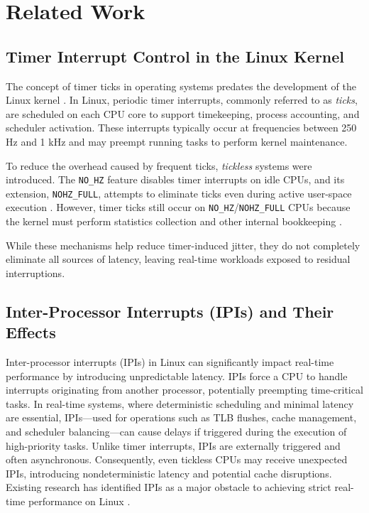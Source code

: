 \documentclass[letterpaper]{article}
\begin{document}
\section{Related Work}\label{BG}
\subsection{Timer Interrupt Control in the Linux Kernel}

The concept of timer ticks in operating systems predates the development of the Linux kernel \cite{Corbet}. 
In Linux, periodic timer interrupts, commonly referred to as \emph{ticks}, are scheduled on each CPU core 
to support timekeeping, process accounting, and scheduler activation. These interrupts typically occur at 
frequencies between 250 Hz and 1 kHz and may preempt running tasks to perform kernel maintenance.  

To reduce the overhead caused by frequent ticks, \emph{tickless} systems were introduced. 
The \texttt{NO\_HZ} feature disables timer interrupts on idle CPUs, and its extension, 
\texttt{NOHZ\_FULL}, attempts to eliminate ticks even during active user-space execution \cite{KernelDocNOHZ}. 
However, timer ticks still occur on \texttt{NO\_HZ}/\texttt{NOHZ\_FULL} CPUs because the kernel must perform 
statistics collection and other internal bookkeeping \cite{stackoverflow}.  

While these mechanisms help reduce timer-induced jitter, they do not completely eliminate all sources of latency, 
leaving real-time workloads exposed to residual interruptions.


\subsection{Inter-Processor Interrupts (IPIs) and Their Effects}

Inter-processor interrupts (IPIs) in Linux can significantly impact real-time performance by introducing 
unpredictable latency. IPIs force a CPU to handle interrupts originating from another processor, 
potentially preempting time-critical tasks. In real-time systems, where deterministic scheduling and 
minimal latency are essential, IPIs—used for operations such as TLB flushes, cache management, 
and scheduler balancing—can cause delays if triggered during the execution of high-priority tasks. 
Unlike timer interrupts, IPIs are externally triggered and often asynchronous. Consequently, even 
tickless CPUs may receive unexpected IPIs, introducing nondeterministic latency and potential cache 
disruptions. Existing research has identified IPIs as a major obstacle to achieving strict real-time 
performance on Linux \cite{YuxinRen}.  
\end{document}
